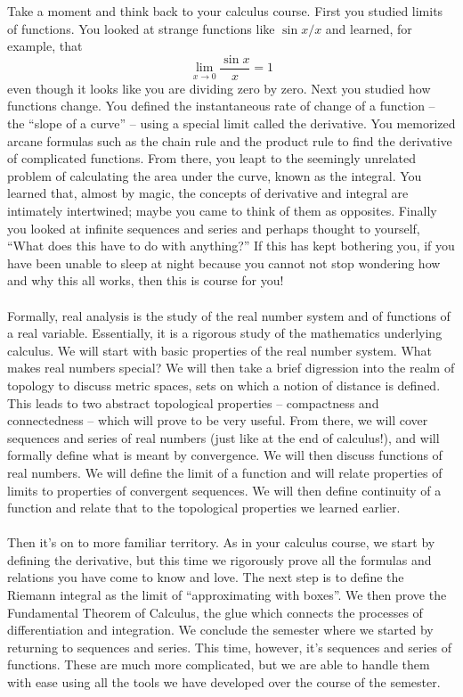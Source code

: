 \documentclass[11pt]{article}
\begin{document}
Take a moment and think back to your calculus course. First you studied limits of functions. You looked at strange functions like $\sin{x} / x$ and learned, for example, that
\[
\lim_{x \rightarrow 0} \frac{\sin{x}}{x} = 1
\]
even though it looks like you are dividing zero by zero. Next you studied how functions change. You defined the instantaneous rate of change of a function -- the ``slope of a curve'' -- using a special limit called the derivative. You memorized arcane formulas such as the chain rule and the product rule to find the derivative of complicated functions. From there, you leapt to the seemingly unrelated problem of calculating the area under the curve, known as the integral. You learned that, almost by magic, the concepts of derivative and integral are intimately intertwined; maybe you came to think of them as opposites. Finally you looked at infinite sequences and series and perhaps thought to yourself, ``What does this have to do with anything?'' If this has kept bothering you, if you have been unable to sleep at night because you cannot not stop wondering how and why this all works, then this is course for you!
\\\\
Formally, real analysis is the study of the real number system and of functions of a real variable. Essentially, it is a rigorous study of the mathematics underlying calculus. We will start with basic properties of the real number system. What makes real numbers special? We will then take a brief digression into the realm of topology to discuss metric spaces, sets on which a notion of distance is defined. This leads to two abstract topological properties -- compactness and connectedness -- which will prove to be very useful. From there, we will cover sequences and series of real numbers (just like at the end of calculus!), and will formally define what is meant by  convergence. We will then discuss functions of real numbers. We will define the limit of a function and will relate properties of limits to properties of convergent sequences. We will then define continuity of a function and relate that to the topological properties we learned earlier. \\\\
Then it's on to more familiar territory. As in your calculus course, we start by defining the derivative, but this time we rigorously prove all the formulas and relations you have come to know and love. The next step is to define the Riemann integral as the limit of ``approximating with boxes''. We then prove the Fundamental Theorem of Calculus, the glue which connects the processes of differentiation and integration. We conclude the semester where we started by returning to sequences and series. This time, however, it's sequences and series of functions. These are much more complicated, but we are able to handle them with ease using all the tools we have developed over the course of the semester.
\end{document}
